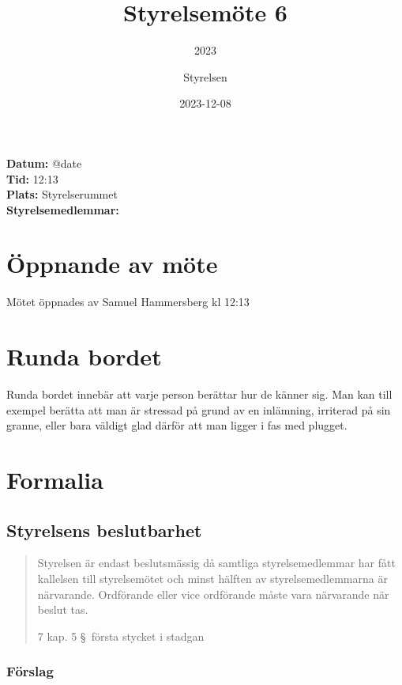 \documentclass[protokoll]{dvd}
\begin{document}
\title{Styrelsemöte 6}
\subtitle{2023}
\author{Styrelsen}
\date{2023-12-08}


\textbf{Datum:} \csname @date\endcsname\\
\textbf{Tid:} 12:13\\
\textbf{Plats:} Styrelserummet\\
\textbf{Styrelsemedlemmar:}
\begin{närvarande_förtroendevalda}
\end{närvarande_förtroendevalda}


\section{Öppnande av möte}

Mötet öppnades av Samuel Hammersberg kl 12:13

\section{Runda bordet}

Runda bordet innebär att varje person berättar hur de känner sig.
Man kan till exempel berätta att man är stressad på grund av en inlämning, irriterad på sin granne, eller bara väldigt glad därför att man ligger i fas med plugget.

\section{Formalia}

\subsection{Styrelsens beslutbarhet}

\blockquote[7 kap. 5 \S~första stycket i stadgan][]{%
    Styrelsen är endast beslutsmässig då samtliga styrelsemedlemmar har fått kallelsen till styrelsemötet och minst hälften av styrelsemedlemmarna är närvarande.
    Ordförande eller vice ordförande måste vara närvarande när beslut tas.
}

\subsubsection*{Förslag}
\end{document}
